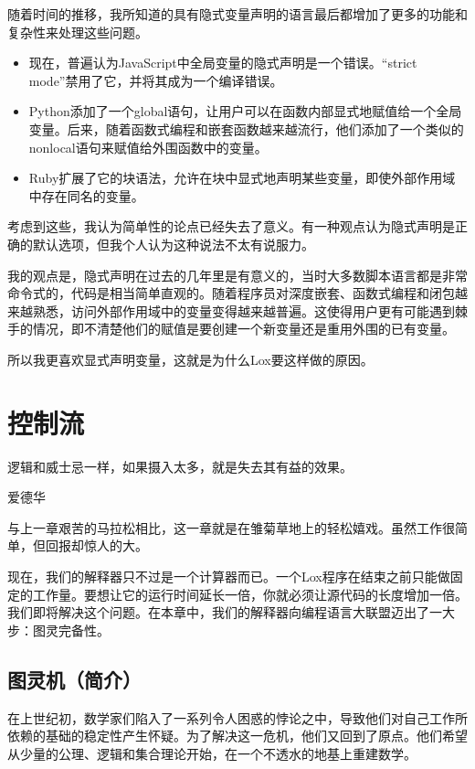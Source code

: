 \documentclass[cn,11pt,chinese]{elegantbook}
\begin{document}
随着时间的推移，我所知道的具有隐式变量声明的语言最后都增加了更多的功能和复杂性来处理这些问题。

\begin{itemize}
  \item 现在，普遍认为JavaScript中全局变量的隐式声明是一个错误。“strict mode”禁用了它，并将其成为一个编译错误。
  \item Python添加了一个global语句，让用户可以在函数内部显式地赋值给一个全局变量。后来，随着函数式编程和嵌套函数越来越流行，他们添加了一个类似的nonlocal语句来赋值给外围函数中的变量。
  \item Ruby扩展了它的块语法，允许在块中显式地声明某些变量，即使外部作用域中存在同名的变量。
\end{itemize}

考虑到这些，我认为简单性的论点已经失去了意义。有一种观点认为隐式声明是正确的默认选项，但我个人认为这种说法不太有说服力。

我的观点是，隐式声明在过去的几年里是有意义的，当时大多数脚本语言都是非常命令式的，代码是相当简单直观的。随着程序员对深度嵌套、函数式编程和闭包越来越熟悉，访问外部作用域中的变量变得越来越普遍。这使得用户更有可能遇到棘手的情况，即不清楚他们的赋值是要创建一个新变量还是重用外围的已有变量。

所以我更喜欢显式声明变量，这就是为什么Lox要这样做的原因。

\chapter{控制流}

\epigraph{逻辑和威士忌一样，如果摄入太多，就是失去其有益的效果。}{爱德华}

与上一章艰苦的马拉松相比，这一章就是在雏菊草地上的轻松嬉戏。虽然工作很简单，但回报却惊人的大。

现在，我们的解释器只不过是一个计算器而已。一个Lox程序在结束之前只能做固定的工作量。要想让它的运行时间延长一倍，你就必须让源代码的长度增加一倍。我们即将解决这个问题。在本章中，我们的解释器向编程语言大联盟迈出了一大步：图灵完备性。

\section{图灵机（简介）}

在上世纪初，数学家们陷入了一系列令人困惑的悖论之中，导致他们对自己工作所依赖的基础的稳定性产生怀疑。为了解决这一危机，他们又回到了原点。他们希望从少量的公理、逻辑和集合理论开始，在一个不透水的地基上重建数学。
\end{document}
